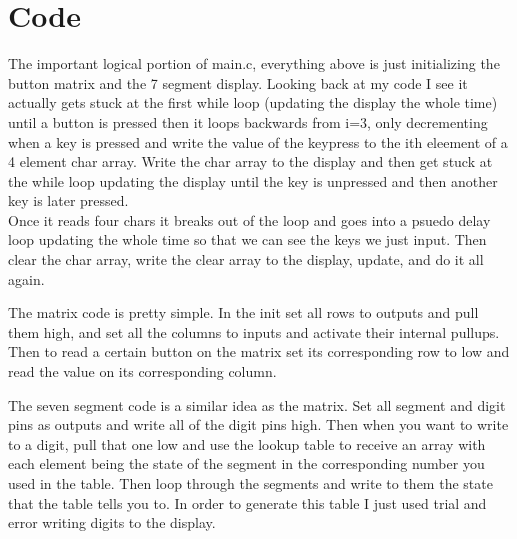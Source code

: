 \documentclass[]{article}
\begin{document}
\section*{Code}
The important logical portion of main.c, everything above is just initializing the button matrix and the 7 segment display. Looking back at my code I see it actually gets stuck at the first while loop (updating the display the whole time) until a button is pressed then it loops backwards from i=3, only decrementing when a key is pressed and write the value of the keypress to the ith eleement of a 4 element char array. Write the char array to the display and then get stuck at the while loop updating the display until the key is unpressed and then another key is later pressed.\\
Once it reads four chars it breaks out of the loop and goes into a psuedo delay loop updating the whole time so that we can see the keys we just input. Then clear the char array, write the clear array to the display, update, and do it all again.

\pagebreak
The matrix code is pretty simple. In the init set all rows to outputs and pull them high, and set all the columns to inputs and activate their internal pullups. Then to read a certain button on the matrix set its corresponding row to low and read the value on its corresponding column.

\pagebreak
The seven segment code is a similar idea as the matrix. Set all segment and digit pins as outputs and write all of the digit pins high. Then when you want to write to a digit, pull that one low and use the lookup table to receive an array with each element being the state of the segment in the corresponding number you used in the table. Then loop through the segments and write to them the state that the table tells you to. In order to generate this table I just used trial and error writing digits to the display.

\pagebreak
\end{document}
